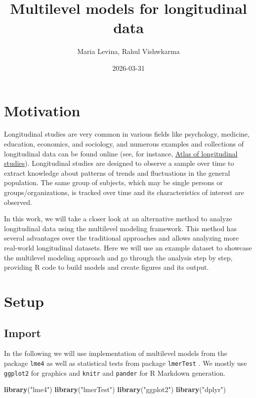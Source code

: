 \documentclass[
  12pt,
]{article}
\title{Multilevel models for longitudinal data}
\author{Maria Levina, Rahul Vishwkarma}
\date{2026-03-31}
\newenvironment{Shaded}{\begin{snugshade}}{\end{snugshade}}
\newcommand{\FunctionTok}[1]{\textcolor[rgb]{0.13,0.29,0.53}{\textbf{#1}}}
\newcommand{\NormalTok}[1]{#1}
\newcommand{\StringTok}[1]{\textcolor[rgb]{0.31,0.60,0.02}{#1}}
\begin{document}
\maketitle

{
\setcounter{tocdepth}{2}
\tableofcontents
}
\newpage

\section{Motivation}\label{motivation}

Longitudinal studies are very common in various fields like psychology,
medicine, education, economics, and sociology, and numerous examples and
collections of longitudinal data can be found online (see, for instance,
\href{https://atlaslongitudinaldatasets.ac.uk/}{Atlas of longitudinal
studies}). Longitudinal studies are designed to observe a sample over
time to extract knowledge about patterns of trends and fluctuations in
the general population. The same group of subjects, which may be single
persons or groups/organizations, is tracked over time and its
characteristics of interest are observed.

In this work, we will take a closer look at an alternative method to
analyze longitudinal data using the multilevel modeling framework. This
method has several advantages over the traditional approaches and allows
analyzing more real-world longitudinal datasets. Here we will use an
example dataset to showcase the multilevel modeling approach and go
through the analysis step by step, providing R code to build models and
create figures and its output.

\section{Setup}\label{setup}

\subsection{Import}\label{import}

In the following we will use implementation of multilevel models from
the package \texttt{lme4} \autocite{lme4_2015} as well as statistical
tests from package \texttt{lmerTest} \autocite{lmertest_2017}. We mostly
use \texttt{ggplot2} \autocite{ggplot2_2016} for graphics and
\texttt{knitr} and \texttt{pander} \autocite{knitr_2014} for R Markdown
generation.

\begin{Shaded}
\begin{Highlighting}[]
  \FunctionTok{library}\NormalTok{(}\StringTok{"lme4"}\NormalTok{)}
  \FunctionTok{library}\NormalTok{(}\StringTok{"lmerTest"}\NormalTok{)}
  \FunctionTok{library}\NormalTok{(}\StringTok{"ggplot2"}\NormalTok{)}
  \FunctionTok{library}\NormalTok{(}\StringTok{"dplyr"}\NormalTok{)}
\end{Highlighting}
\end{Shaded}
\end{document}

